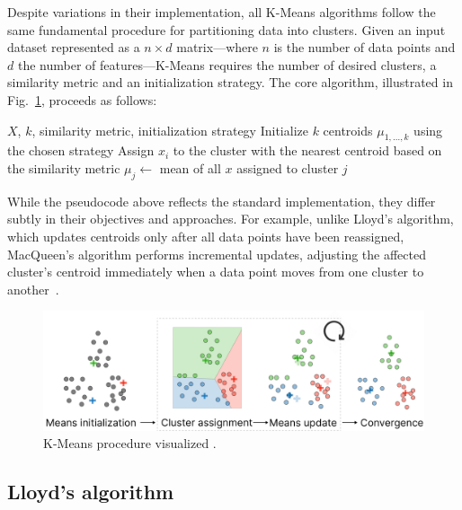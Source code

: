 \documentclass[10pt,twocolumn,letterpaper]{article}
\begin{document}
Despite variations in their implementation, all K-Means algorithms follow the
same fundamental procedure for partitioning data into clusters. Given an input
dataset represented as a $n \times d$ matrix—where $n$ is the number of data
points and $d$ the number of features—K-Means requires the number of desired
clusters, a similarity metric and an initialization strategy. The core
algorithm, illustrated in Fig.~\ref{fig:kmeans-procedure}, proceeds as follows:
\begin{algorithmic}[1]
    \Require $X$, $k$, similarity metric, initialization strategy
    \State Initialize $k$ centroids $\mu_{1, \dots, k}$ using the chosen strategy
    \Repeat
    \State Assign $x_i$ to the cluster with the nearest centroid based on the similarity metric
    \EndFor
    \State $\mu_j\gets$ mean of all $x$ assigned to cluster $j$
    \EndFor
\end{algorithmic}
While the pseudocode above reflects the standard implementation, they differ subtly in their objectives and
approaches. For example, unlike Lloyd's algorithm, which updates centroids only
after all data points have been reassigned, MacQueen's algorithm performs
incremental updates, adjusting the affected cluster’s centroid immediately when
a data point moves from one cluster to another~\cite{Morissette2013}.

\begin{figure}[h]
    \centering
    \includegraphics[width=1\linewidth]{figures/K-Means procedure}
    \caption{K-Means procedure visualized \cite{Amidi2018}.}
    \label{fig:kmeans-procedure}
\end{figure}


\subsection{Lloyd's algorithm}\label{subsec:procedure-and-lloyd's-algorithm}
\end{document}
